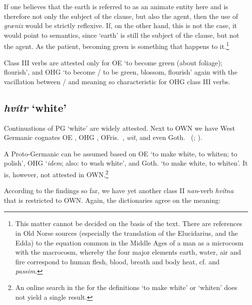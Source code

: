\documentclass[output=paper,colorlinks,citecolor=brown]{langscibook}
\begin{document}
If one believes that the earth is referred to as an animate entity here and is therefore not only the subject of the clause, but also the agent, then the use of \textit{græniz}    would be strictly reflexive. If, on the other hand, this is not the case, it would point to  semantics, since  ‘earth’ is still the subject of the clause, but not the agent. As the patient, becoming green is something that happens to it.\footnote{This matter cannot be decided on the basis of the text. There are references in Old Norse sources (especially the translation of the Elucidarius, and the Edda) to the equation common in the Middle Ages of a man as a microcosm with the macrocosm, whereby the four major elements earth, water, air and fire correspond to human flesh, blood, breath and body heat, cf. \citet[94--95]{Simek1990} and \textit{passim}.}

Class III verbs are attested only for OE  ‘to become green (about foliage); flourish’, and OHG  ‘to become / to be green, blossom, flourish’ again with the vacillation between / and  meaning so characteristic for OHG class III verbs. 

\subsection{\textit{hvítr} ‘white’}
\label{sec:OWNwhite}

\largerpage

Continuations of PG  ‘white’ are widely attested. Next to OWN  we have West Germanic cognates OE , OHG , OFris.\ , \textit{wit}, and even Goth.\  (; ).

A Proto-Germanic   can be assumed based on OE  ‘to make white, to whiten; to polish’, OHG  ‘\textit{idem}; also: to wash white’, and Goth.  ‘to make white, to whiten’. It is, however, not attested in OWN.\footnote{An online search in the  for the definitions ‘to make white’ or ‘whiten’ does not yield a single result.}

According to the findings so far, we have yet another class II \textit{nan}-verb \textit{hvítna} that is restricted to OWN. Again, the dictionaries agree on the meaning:
\end{document}
